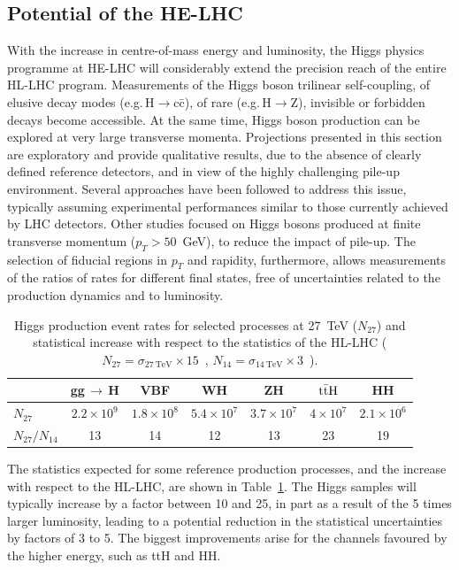 \documentclass[../report.tex]{subfiles}
\begin{document}
\subsection{Potential of the HE-LHC}
With the increase in centre-of-mass energy and luminosity, the Higgs physics programme at HE-LHC will considerably extend the precision reach of the entire HL-LHC program. Measurements of the Higgs boson trilinear self-coupling, of elusive decay modes (e.g.\,H$\to$c\={c}), of rare (e.g.\,H$\to$Z\textgamma), invisible or forbidden decays become accessible. At the same time, Higgs boson production can be explored at very large transverse momenta.
Projections presented in this section are exploratory and provide qualitative results, due to the absence of clearly defined reference detectors, and in view of the highly challenging pile-up environment. Several approaches have been followed to address this issue, typically assuming experimental performances similar to those currently achieved by LHC detectors. Other studies focused on Higgs bosons produced at finite transverse momentum ($p_T>50$~GeV), to reduce the impact of pile-up. The selection of fiducial regions in $p_T$ and rapidity, furthermore, allows measurements of the ratios of rates for different final states, free of uncertainties related to the production dynamics and to luminosity. 

\begin{table}[h]
\centering
  \caption{\label{tab:Hrates}
Higgs production event rates for selected processes
    at 27~TeV ($N_{27}$) and
 statistical increase with 
 respect to the statistics of the HL-LHC ($N_{27}=\sigma_{27~\mathrm{TeV}} \times 15$~\iab, 
 $N_{14}=\sigma_{14~\mathrm{TeV}} \times 3$~\iab).} 
\begin{tabular}{|l|c|c|c|c|c|c|} 
\hline  \hline
&  gg\,$\to$\,H   & VBF &
 WH  &
 ZH  &
 $\rm t\bar{t}H$ &
 HH 
 \\ \hline
$N_{27}$  & $2.2\times 10^9$ & $1.8\times 10^8$ & $5.4\times 10^7$ & $3.7\times
 10^7$ &  $4\times 10^7$ & $2.1 \times 10^6$  \\
$N_{27}/N_{14}$ & 13 & 14 & 12 & 13 &23 & 19
\\ \hline
\hline
\end{tabular}
\end{table}
The statistics expected for some reference production processes, and the increase with respect to the HL-LHC, are shown in
Table~\ref{tab:Hrates}. The Higgs samples will typically increase by a factor between 10 and 25, in part as a result of the 5 times larger luminosity, leading to a potential reduction in the statistical uncertainties by factors of 3 to 5. The biggest improvements arise for the channels favoured by the higher energy, such as ttH and HH.
\end{document}
